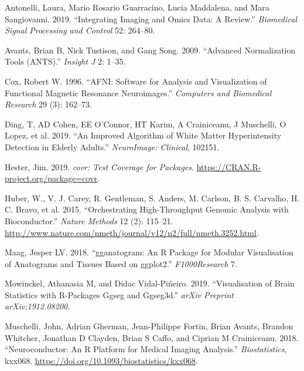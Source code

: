 \documentclass[]{elsarticle} %
\newlength{\cslhangindent}
\newenvironment{cslreferences}%
  {\setlength{\parindent}{0pt}%
  \everypar{\setlength{\hangindent}{\cslhangindent}}\ignorespaces}%
  {\par}
\begin{document}
\hypertarget{refs}{}
\begin{cslreferences}
\leavevmode\hypertarget{ref-antonelli2019integrating}{}%
Antonelli, Laura, Mario Rosario Guarracino, Lucia Maddalena, and Mara Sangiovanni. 2019. ``Integrating Imaging and Omics Data: A Review.'' \emph{Biomedical Signal Processing and Control} 52: 264--80.

\leavevmode\hypertarget{ref-avants2009advanced}{}%
Avants, Brian B, Nick Tustison, and Gang Song. 2009. ``Advanced Normalization Tools (ANTS).'' \emph{Insight J} 2: 1--35.

\leavevmode\hypertarget{ref-afni}{}%
Cox, Robert W. 1996. ``AFNI: Software for Analysis and Visualization of Functional Magnetic Resonance Neuroimages.'' \emph{Computers and Biomedical Research} 29 (3): 162--73.

\leavevmode\hypertarget{ref-ding2019improved}{}%
Ding, T, AD Cohen, EE O'Connor, HT Karim, A Crainiceanu, J Muschelli, O Lopez, et al. 2019. ``An Improved Algorithm of White Matter Hyperintensity Detection in Elderly Adults.'' \emph{NeuroImage: Clinical}, 102151.

\leavevmode\hypertarget{ref-covr}{}%
Hester, Jim. 2019. \emph{covr: Test Coverage for Packages}. \url{https://CRAN.R-project.org/package=covr}.

\leavevmode\hypertarget{ref-bioconductor}{}%
Huber, W., V. J. Carey, R. Gentleman, S. Anders, M. Carlson, B. S. Carvalho, H. C. Bravo, et al. 2015. ``Orchestrating High-Throughput Genomic Analysis with Bioconductor.'' \emph{Nature Methods} 12 (2): 115--21. \url{http://www.nature.com/nmeth/journal/v12/n2/full/nmeth.3252.html}.

\leavevmode\hypertarget{ref-maag2018gganatogram}{}%
Maag, Jesper LV. 2018. ``gganatogram: An R Package for Modular Visualisation of Anatograms and Tissues Based on ggplot2.'' \emph{F1000Research} 7.

\leavevmode\hypertarget{ref-mowinckel2019visualisation}{}%
Mowinckel, Athanasia M, and Didac Vidal-Piñeiro. 2019. ``Visualisation of Brain Statistics with R-Packages Ggseg and Ggseg3d.'' \emph{arXiv Preprint arXiv:1912.08200}.

\leavevmode\hypertarget{ref-neuroconductor}{}%
Muschelli, John, Adrian Gherman, Jean-Philippe Fortin, Brian Avants, Brandon Whitcher, Jonathan D Clayden, Brian S Caffo, and Ciprian M Crainiceanu. 2018. ``Neuroconductor: An R Platform for Medical Imaging Analysis.'' \emph{Biostatistics}, kxx068. \url{https://doi.org/10.1093/biostatistics/kxx068}.


\end{cslreferences}
\end{document}

